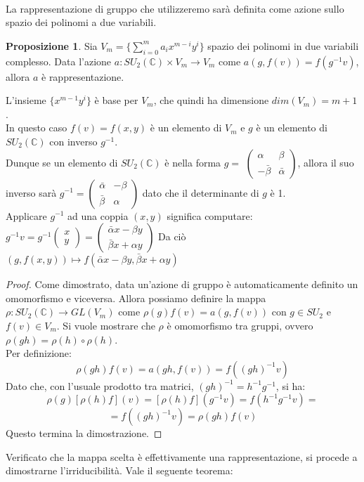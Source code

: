 \documentclass[12pt,a4paper]{report}
\theoremstyle{definition}
\newtheorem{Prop}[Def]{Proposizione}
\theoremstyle{definition}
\theoremstyle{definition}
\theoremstyle{remark}
\begin{document}
\\
La rappresentazione di gruppo che utilizzeremo sarà definita come azione sullo spazio dei polinomi a due variabili.
\begin{Prop}
	Sia $V_m=\{\sum_{i=0}^{m} a_ix^{m-i}y^i\}$ spazio dei polinomi in due variabili complesso. Data l'azione $a:SU_2(\mathbb{C})\times V_m\rightarrow V_m$ come $a(g,f(v))=f(g^{-1}v)$, allora $a$ è rappresentazione.
\end{Prop}
L'insieme $\{x^{m-1}y^i\}$ è base per $V_m$, che quindi ha dimensione $dim(V_m)=m+1$.\\
In questo caso $f(v)=f(x,y)$ è un elemento di $V_m$ e $g$ è un elemento di $SU_2(\mathbb{C})$ con inverso $g^{-1}$.\\
Dunque se un elemento di $SU_2(\mathbb{C})$ è nella forma $g=$
$\begin{pmatrix}
	\alpha&\beta\\
	-\bar{\beta}&\bar{\alpha}
\end{pmatrix}$,
allora il suo inverso sarà $g^{-1}=
\begin{pmatrix}
	\bar{\alpha}&-\beta\\
	\bar{\beta}&\alpha
\end{pmatrix}$ dato che il determinante di $g$ è 1. \\
Applicare $g^{-1}$ ad una coppia $(x,y)$ significa computare:
$g^{-1}v=g^{-1}
\begin{pmatrix}
	x\\y
\end{pmatrix}=
\begin{pmatrix}
	\bar{\alpha}x-\beta y\\
	\bar{\beta}x+\alpha y
\end{pmatrix}$
Da ciò $(g,f(x,y))\longmapsto f(\bar{\alpha}x-\beta y,\bar{\beta}x+\alpha y)$
\begin{proof}
	Come dimostrato, data un'azione di gruppo è automaticamente definito un omomorfismo e viceversa. Allora possiamo definire la mappa $\rho:SU_2(\mathbb{C})\rightarrow GL(V_m)$ come $\rho(g)f(v)=a(g,f(v))$ con $g\in SU_2$ e $f(v)\in V_m$.
	Si vuole mostrare che $\rho$ è omomorfismo tra gruppi, ovvero $\rho(gh)=\rho(h)\circ\rho(h)$.\\
	Per definizione:
	$$\rho(gh)f(v)=a(gh,f(v))=f((gh)^{-1}v)$$
	Dato che, con l'usuale prodotto tra matrici, $(gh)^{-1}=h^{-1}g^{-1}$, si ha:
	$$\rho(g)[\rho(h)f](v)=[\rho(h)f](g^{-1}v)=f(h^{-1}g^{-1}v)=$$
	$$=f((gh)^{-1}v)=\rho(gh)f(v)$$
	Questo termina la dimostrazione.
\end{proof}
Verificato che la mappa scelta è effettivamente una rappresentazione, si procede a dimostrarne l'irriducibilità. Vale il seguente teorema:
\end{document}
